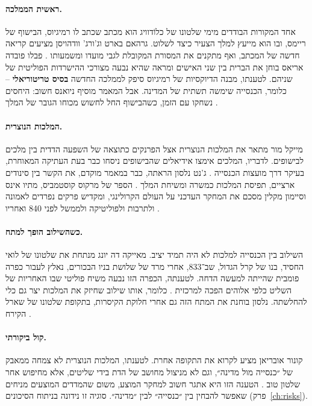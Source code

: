 \paragraph{ראשית הממלכה.} אחד המקורות הבודדים מימי שלטונו של כלוֹדוויג הוא מכתב שכתב לו רמיגיוס, הבישוף של ריימס, ובו הוא מייעץ למלך הצעיר כיצד לשלוט. גרהאם בארט וג'ורג' וודהויסן מציעים קריאה חדשה של המכתב, ואף מתקנים את המסורת המקובלת לגבי מועדו ומשמעותו \cite{barrett2016remigius}. פבלו פובדה אריאס בוחן את הברית בין שני האישים ומראה שהיא נבעה מצורכי ההישרדות הפוליטית של שניהם. לטענתו, מבנה הדיוקסיות של רמיגיוס סיפק לממלכה החדשה \textbf{בסיס טריטוריאלי} – כלומר, הכנסייה שימשה תשתית של המדינה. אבל המאמר מוסיף ניואנס חשוב: היחסים נשחקו עם הזמן, כשהבישוף החל לחשוש מכוחו הגובר של המלך \cite{poveda2019clovis}.

\paragraph{המלכות הנוצרית.} מייקל מור מתאר את המלכות הנוצרית אצל הפרנקים כתוצאה של השפעה הדדית בין מלכים לבישופים. לדבריו, המלכים אימצו אידיאלים שהבישופים ניסחו כבר בעת העתיקה המאוחרת, בעיקר דרך מועצות הכנסייה \cite{moore2011sacred}. ג'נט נלסון הראתה, כבר במאמר מוקדם, את הקשר בין סינודים ארציים, תפיסת המלכות כמשרה ומשיחת המלך \cite{nelson1971synods}. הספר של מרקוס קוסטמביס, מתיו אינס וסיימון מקלין מסכם את המחקר העדכני על העולם הקרולינגי, ומקדיש פרקים נפרדים לאמונה ולתרבות ולפוליטיקה ולממשל לפני 840 ואחריו \cite{costambeys2011carolingian}.

\paragraph{כשהשילוב הופך למתח.} השילוב בין הכנסייה למלכות לא היה תמיד יציב. מאייקה דה יונג מנתחת את שלטונו של לואי החסיד, בנו של קרל הגדול, שב־833, אחרי מרד של שלושת בניו הבכורים, נאלץ לעבור כפרה פומבית שהייתה למעשה הדחה. לטענתה, הכפרה הזו נבעה משיח פוליטי שבו האחריות של השליט כלפי אלוהים הפכה למרכזית \cite{dejong2009penitential}. כלומר, אותו שילוב שחיזק את המלכות יצר גם כלי להחלשתה. נלסון בוחנת את המתח הזה גם אחרי חלוקת הקיסרות, בתקופת שלטונו של שארל הקירח \cite{nelson1991bailiffs}.

\paragraph{קול ביקורתי.} קונור אובריאן מציע לקרוא את התקופה אחרת. לטענתו, המלכות הנוצרית לא צמחה ממאבק של ״כנסייה מול מדינה״, וגם לא מניצול מחושב של הדת בידי שליטים, אלא מחיפוש אחר שלטון טוב \cite{obrien2026rise}. הטענה הזו היא אתגר חשוב למחקר המוצע, משום שהמדדים המוצעים מניחים שאפשר להבחין בין ״כנסייה״ לבין ״מדינה״. סוגיה זו נידונה בניתוח הסיכונים (פרק~\ref{ch:risks}).

